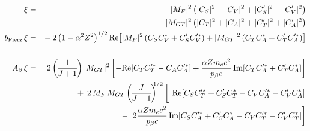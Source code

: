 %
%
%
\begin{eqnarray}
    \xi &=& 
    	|M_F|^2    \left( |C_S|^2 + |C_V|^2 + |C_S^\prime|^2 + |C_V^\prime|^2 \right) 
		\nonumber \\ && + \;\,
		|M_{GT}|^2 \left( |C_T|^2 + |C_A|^2 + |C_T^\prime|^2 + |C_A^\prime|^2 \right)
		\label{eq:jtw_xi_integrated} \\
    \bFierz \, \xi &=& 
    	- \: 2 %
		\left( 1-\alpha^2 Z^2 \right)^{1/2} 
		\textrm{Re}\!\left[ |M_F|^2 \left( C_S C_V^* + C_S^\prime C_V^{\prime *} \right) 
    	+ |M_{GT}|^2 \left( C_T C_A^* + C_T^{\prime} C_A^{\prime *} \right) \right] 
		\nonumber \\
    	\label{eq:jtw_bxi_integrated} \\
    \Abeta \, \xi &=& 
    	2 \left(\! \frac{1}{J+1} \! \right) |M_{GT}|^2 \left[ - \textrm{Re}\!\left[ C_T C_T^{\prime *} - C_A C_A^{\prime *} \right] + \frac{\alpha Z \me c^2}{\pbeta c} \,\textrm{Im}\!\left[ C_T C_A^{\prime *} + C_T^\prime C_A^* \right] \right] 
		\nonumber \\ && + \;\, 
		2\,  M_F\,M_{GT} \left(\! \frac{J}{J+1} \! \right)^{\!\!\! 1/2} \left[ \phantom{\frac{1}{1}\!\!\!} \,\textrm{Re} \! \left[ C_S C_T^{\prime *} +  C_S^\prime C_T^* - C_V C_A^{\prime *} - C_V^\prime C_A^* \right] 
		\right.
		\nonumber \\ && - \;
		\left.
		2 \frac{\alpha Z \me c^2}{\pbeta c} \,\textrm{Im}\!\left[ C_S C_A^{\prime *} + C_S^\prime C_A^* - C_V C_T^{\prime *} -C_V^\prime C_T^* \right] \right]
	\label{eq:jtw_Abetaxi_integrated}
\end{eqnarray}
%
%